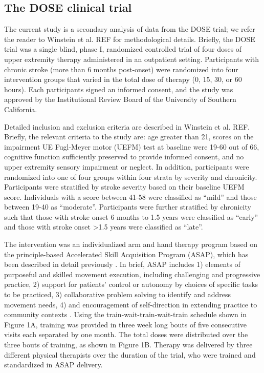 \subsection{The DOSE clinical trial}
The current study is a secondary analysis of data from the DOSE trial; we refer the reader to Winstein et al. REF for methodological details. 
Briefly, the DOSE trial was a single blind, phase I, randomized controlled trial of four doses of upper extremity therapy administered in an outpatient setting.  
Participants with chronic stroke (more than 6 months post-onset) were randomized into four intervention groups that varied in the total dose of therapy (0, 15, 30, or 60 hours).  
Each participants signed an informed consent, and the study was approved by the Institutional Review Board of the University of Southern California.

Detailed inclusion and exclusion criteria are described in Winstein et al. REF. 
Briefly, the relevant criteria to the study are: age greater than 21, scores on the impairment UE Fugl-Meyer motor (UEFM) test at baseline were 19-60 out of 66, cognitive function sufficiently preserved to provide informed consent, and no upper extremity sensory impairment or neglect. 
In addition, participants were randomized into one of four groups within four strata by severity and chronicity.  
Participants were stratified by stroke severity based on their baseline UEFM score.  
Individuals with a score between 41-58 were classified as “mild” and those between 19-40 as “moderate”.  
Participants were further stratified by chronicity such that those with stroke onset 6 months to 1.5 years were classified as “early” and those with stroke onset >1.5 years were classified as “late”. 

The intervention was an individualized arm and hand therapy program based on the principle-based Accelerated Skill Acquisition Program (ASAP), which has been described in detail previously \cite{Winstein2014}. 
In brief, ASAP includes 1) elements of purposeful and skilled movement execution, including challenging and progressive practice, 2) support for patients’ control or autonomy by choices of specific tasks to be practiced, 3) collaborative problem solving to identify and address movement needs, 4) and encouragement of self-direction in extending practice to community contexts \cite{Winstein2014}. 
Using the train-wait-train-wait-train schedule shown in Figure 1A, training was provided in three week long bouts of five consecutive visits each separated by one month. 
The total doses were distributed over the three bouts of training, as shown in Figure 1B. 
Therapy was delivered by three different physical therapists over the duration of the trial, who were trained and standardized in ASAP delivery. 

